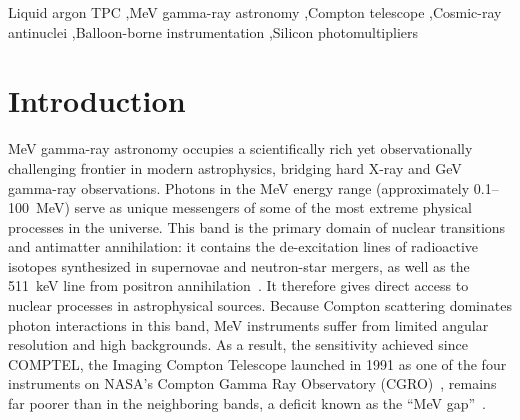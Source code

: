 \documentclass[a4paper,fleqn,longmktitle]{cas-dc}
\begin{document}



\begin{keywords}
Liquid argon TPC \sep MeV gamma-ray astronomy \sep Compton telescope \sep Cosmic-ray antinuclei \sep Balloon-borne instrumentation \sep Silicon photomultipliers
\end{keywords}

\nolinenumbers
\maketitle
\linenumbers

\section{Introduction}\label{chap:Introduction}
MeV gamma-ray astronomy occupies a scientifically rich yet observationally challenging frontier in modern astrophysics, bridging hard X-ray and GeV gamma-ray observations.
Photons in the MeV energy range (approximately 0.1--100~MeV) serve as unique messengers of some of the most extreme physical processes in the universe.
This band is the primary domain of nuclear transitions and antimatter annihilation: it contains the de-excitation lines of radioactive isotopes synthesized in supernovae and neutron-star mergers, as well as the 511~keV line from positron annihilation~\cite{aramaki2020dual, DEANGELIS20181}.
It therefore gives direct access to nuclear processes in astrophysical sources.
Because Compton scattering dominates photon interactions in this band, MeV instruments suffer from limited angular resolution and high backgrounds.
As a result, the sensitivity achieved since COMPTEL, the Imaging Compton Telescope launched in 1991 as one of the four instruments on NASA's Compton Gamma Ray Observatory (CGRO)~\cite{schonfelder1993comptel, refId0}, remains far poorer than in the neighboring bands, a deficit known as the ``MeV gap''~\cite{aramaki2020dual}.
 
\end{document}

